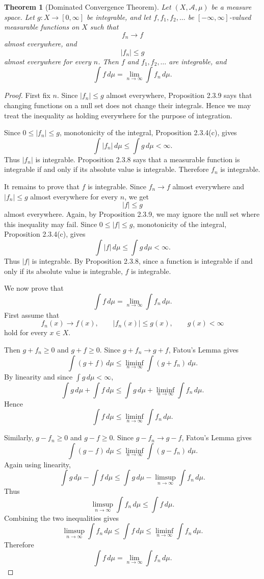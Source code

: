\documentclass[12pt]{article}
\newtheorem{theorem}{Theorem}
\begin{document}
\begin{theorem}[Dominated Convergence Theorem]
Let $(X,\mathcal{A},\mu)$ be a measure space. Let $g:X\to[0,\infty]$ be
integrable, and let $f,f_1,f_2,\dots$ be $[-\infty,\infty]$-valued measurable
functions on $X$ such that
\[
f_n \to f
\]
almost everywhere, and
\[
|f_n| \le g
\]
almost everywhere for every $n$. Then $f$ and $f_1,f_2,\dots$ are integrable, and
\[
\int f\,d\mu
=
\lim_{n\to\infty}\int f_n\,d\mu.
\]
\end{theorem}

\begin{proof}
First fix $n$. Since $|f_n| \le g$ almost everywhere, Proposition 2.3.9 says that
changing functions on a null set does not change their integrals. Hence we may
treat the inequality as holding everywhere for the purpose of integration.

Since $0 \le |f_n| \le g$, monotonicity of the integral, Proposition 2.3.4(c),
gives
\[
\int |f_n|\,d\mu \le \int g\,d\mu < \infty.
\]
Thus $|f_n|$ is integrable. Proposition 2.3.8 says that a measurable function is
integrable if and only if its absolute value is integrable. Therefore $f_n$ is
integrable.

It remains to prove that $f$ is integrable. Since $f_n \to f$ almost everywhere
and $|f_n| \le g$ almost everywhere for every $n$, we get
\[
|f| \le g
\]
almost everywhere. Again, by Proposition 2.3.9, we may ignore the null set where
this inequality may fail. Since $0 \le |f| \le g$, monotonicity of the integral,
Proposition 2.3.4(c), gives
\[
\int |f|\,d\mu \le \int g\,d\mu < \infty.
\]
Thus $|f|$ is integrable. By Proposition 2.3.8, since a function is integrable
if and only if its absolute value is integrable, $f$ is integrable.

We now prove that
\[
\int f\,d\mu = \lim_{n\to\infty}\int f_n\,d\mu.
\]
First assume that
\[
f_n(x)\to f(x), \qquad |f_n(x)|\le g(x), \qquad g(x)<\infty
\]
hold for every $x\in X$.

Then $g+f_n\ge 0$ and $g+f\ge 0$. Since $g+f_n\to g+f$, Fatou's Lemma gives
\[
\int (g+f)\,d\mu
\le
\liminf_{n\to\infty}\int (g+f_n)\,d\mu.
\]
By linearity and since $\int g\,d\mu<\infty$,
\[
\int g\,d\mu+\int f\,d\mu
\le
\int g\,d\mu+\liminf_{n\to\infty}\int f_n\,d\mu.
\]
Hence
\[
\int f\,d\mu
\le
\liminf_{n\to\infty}\int f_n\,d\mu.
\]

Similarly, $g-f_n\ge 0$ and $g-f\ge 0$. Since $g-f_n\to g-f$, Fatou's Lemma gives
\[
\int (g-f)\,d\mu
\le
\liminf_{n\to\infty}\int (g-f_n)\,d\mu.
\]
Again using linearity,
\[
\int g\,d\mu-\int f\,d\mu
\le
\int g\,d\mu-\limsup_{n\to\infty}\int f_n\,d\mu.
\]
Thus
\[
\limsup_{n\to\infty}\int f_n\,d\mu
\le
\int f\,d\mu.
\]
Combining the two inequalities gives
\[
\limsup_{n\to\infty}\int f_n\,d\mu
\le
\int f\,d\mu
\le
\liminf_{n\to\infty}\int f_n\,d\mu.
\]
Therefore
\[
\int f\,d\mu
=
\lim_{n\to\infty}\int f_n\,d\mu.
\]


\end{proof}
\end{document}
